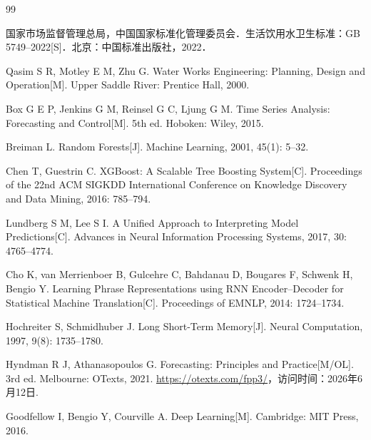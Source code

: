 \documentclass[UTF8,zihao=-4]{ctexart}
\begin{document}
\begin{thebibliography}{99}

国家市场监督管理总局，中国国家标准化管理委员会．生活饮用水卫生标准：GB 5749--2022[S]．北京：中国标准出版社，2022．

Qasim S R, Motley E M, Zhu G. Water Works Engineering: Planning, Design and Operation[M]. Upper Saddle River: Prentice Hall, 2000.

Box G E P, Jenkins G M, Reinsel G C, Ljung G M. Time Series Analysis: Forecasting and Control[M]. 5th ed. Hoboken: Wiley, 2015.

Breiman L. Random Forests[J]. Machine Learning, 2001, 45(1): 5--32.

Chen T, Guestrin C. XGBoost: A Scalable Tree Boosting System[C]. Proceedings of the 22nd ACM SIGKDD International Conference on Knowledge Discovery and Data Mining, 2016: 785--794.

Lundberg S M, Lee S I. A Unified Approach to Interpreting Model Predictions[C]. Advances in Neural Information Processing Systems, 2017, 30: 4765--4774.

Cho K, van Merrienboer B, Gulcehre C, Bahdanau D, Bougares F, Schwenk H, Bengio Y. Learning Phrase Representations using RNN Encoder--Decoder for Statistical Machine Translation[C]. Proceedings of EMNLP, 2014: 1724--1734.

Hochreiter S, Schmidhuber J. Long Short-Term Memory[J]. Neural Computation, 1997, 9(8): 1735--1780.

Hyndman R J, Athanasopoulos G. Forecasting: Principles and Practice[M/OL]. 3rd ed. Melbourne: OTexts, 2021. \url{https://otexts.com/fpp3/}，访问时间：2026年6月12日.

Goodfellow I, Bengio Y, Courville A. Deep Learning[M]. Cambridge: MIT Press, 2016.

\end{thebibliography}

\newpage
\end{document}
